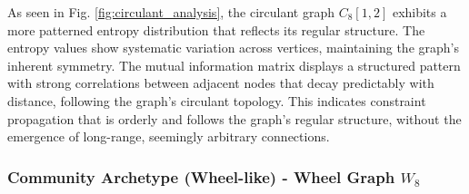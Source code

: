 \documentclass[12pt, letterpaper]{article}
\begin{document}
As seen in Fig. \ref{fig:circulant_analysis}, the circulant graph $C_8[1,2]$ exhibits a more patterned entropy distribution that reflects its regular structure. The entropy values show systematic variation across vertices, maintaining the graph's inherent symmetry. The mutual information matrix displays a structured pattern with strong correlations between adjacent nodes that decay predictably with distance, following the graph's circulant topology. This indicates constraint propagation that is orderly and follows the graph's regular structure, without the emergence of long-range, seemingly arbitrary connections.

\subsubsection{Community Archetype (Wheel-like) - Wheel Graph $W_8$}
\end{document}
